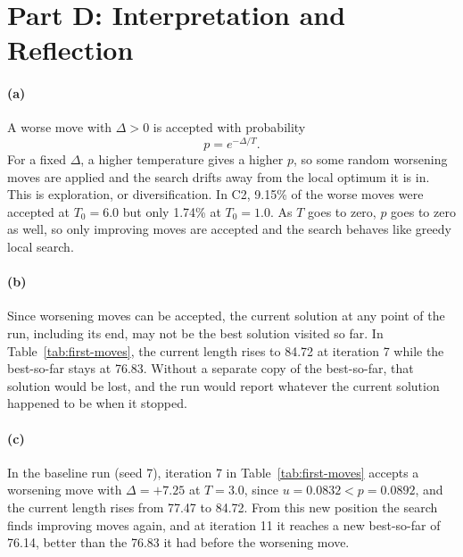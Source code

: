 \documentclass[11pt]{article}
\begin{document}
\section*{Part D: Interpretation and Reflection}

\paragraph{(a)}
A worse move with $\Delta > 0$ is accepted with probability
\[
p = e^{-\Delta / T}.
\]
For a fixed $\Delta$, a higher temperature gives a higher $p$, so some random worsening moves are applied and the search drifts away from the local optimum it is in. This is exploration, or diversification. In C2, 9.15\% of the worse moves were accepted at $T_0 = 6.0$ but only 1.74\% at $T_0 = 1.0$. As $T$ goes to zero, $p$ goes to zero as well, so only improving moves are accepted and the search behaves like greedy local search.

\paragraph{(b)}
Since worsening moves can be accepted, the current solution at any point of the run, including its end, may not be the best solution visited so far. In Table~\ref{tab:first-moves}, the current length rises to 84.72 at iteration 7 while the best-so-far stays at 76.83. Without a separate copy of the best-so-far, that solution would be lost, and the run would report whatever the current solution happened to be when it stopped.

\paragraph{(c)}
In the baseline run (seed 7), iteration 7 in Table~\ref{tab:first-moves} accepts a worsening move with $\Delta = +7.25$ at $T = 3.0$, since $u = 0.0832 < p = 0.0892$, and the current length rises from 77.47 to 84.72. From this new position the search finds improving moves again, and at iteration 11 it reaches a new best-so-far of 76.14, better than the 76.83 it had before the worsening move.
\end{document}
